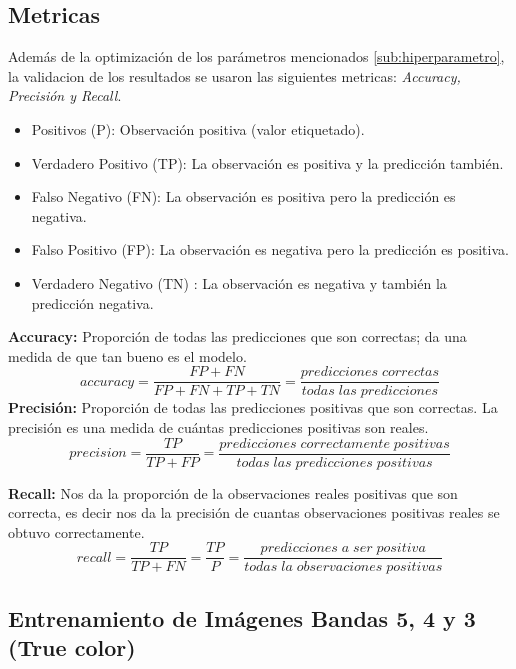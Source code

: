 \subsection{Metricas}\label{sub:metricas}

Además de la optimización de los parámetros mencionados \ref{sub:hiperparametro}, la validacion de los resultados se usaron las siguientes metricas: \textit{Accuracy, Precisión y Recall}.

\begin{itemize}
	\item Positivos (P): Observación positiva (valor etiquetado).
	\item Verdadero Positivo (TP): La observación es positiva y la predicción también.
	\item Falso Negativo (FN): La observación es positiva pero la predicción es negativa.
	\item Falso Positivo (FP): La observación es negativa pero la predicción es positiva.
	\item Verdadero Negativo (TN) :  La observación es negativa y también la predicción negativa.
\end{itemize}

\textbf{Accuracy:} Proporción de todas las predicciones que son correctas; da una medida de que tan bueno es el modelo.
\begin{equation}
accuracy = \frac{FP+FN}{FP+FN+TP+TN}=\frac{predicciones\;correctas}{todas\;las\;predicciones}
\end	{equation}
\textbf{Precisión:} Proporción de todas las predicciones positivas que son correctas. La precisión es una medida de cuántas predicciones positivas son reales.
\begin{equation}
precision=\frac{TP}{TP+FP}= \frac{predicciones\;correctamente\;positivas}{todas\;las\;predicciones\;positivas}
\end{equation}

\textbf{Recall:} Nos da la proporción de la observaciones reales positivas que son correcta, es decir nos da la precisión de cuantas observaciones positivas reales se obtuvo correctamente.
\begin{equation}
recall = \frac{TP}{TP+FN} = \frac{TP}{P} = \frac{predicciones\;a\;ser\;positiva}{todas\;la\;observaciones\;positivas} 
\end{equation}




\subsection{Entrenamiento de Imágenes Bandas 5, 4 y 3 (True color)}\label{sub:entrenamiento_bandas543}

